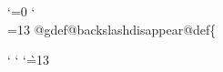 {{\let\indexlbrace\relax
\let\indexrbrace\relax
\let\indexatchar\relax
\let\indexbackslash\relax

{\catcode`\@=0
\catcode`\\=13
  @gdef@backslashdisappear{@def\{}}
}

{
\catcode`
\catcode`
\catcode`\`=13
  \gdef\indexnonalnumdisappear{%
    \ifflagclear{txiindexlquoteignore}{}{%
      \let`=\empty
    }%
    \ifflagclear{txiindexbackslashignore}{}{%
      \backslashdisappear
    }%
    \ifflagclear{txiindexhyphenignore}{}{%
      \def-{}%
    }%
    \ifflagclear{txiindexlessthanignore}{}{%
      \def<{}%
    }%
    \ifflagclear{txiindexatsignignore}{}{%
      \def\@{}%
    }%
  }

  \gdef\indexnonalnumreappear{%
    \let-\normaldash
    \let<\normalless
  }
}


%
\def\indexnofonts{%
  \indexnofontstrue
  \def\ { }%
  \def\@{@}%
  \def\_{\normalunderscore}%
  \def\-{}%
  \uccode`\1=`\{ \uppercase{\def\{{1}}%
  \uccode`\1=`\} \uppercase{\def\}{1}}%
  \def\lbracechar##1{\{}%
  \def\rbracechar##1{\}}%
  \def\commondummyword##1{\let##1\asis}%
  \macrolist
  \let\value\indexnofontsvalue
}




\def\doind#1#2{%
  \iflinks
  {%
    \requireopenindexfile{#1}%
    \edef\writeto{\csname#1indfile\endcsname}%
    \def\indextext{#2}%
    \safewhatsit\doindwrite
  }%
  \fi
}

\def\docind#1#2{%
  \iflinks
  {%
    \requireopenindexfile{#1}%
    \edef\writeto{\csname#1indfile\endcsname}%
    \def\indextext{#2}%
    \safewhatsit\docindwrite
  }%
  \fi
}

}

